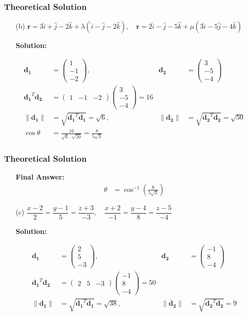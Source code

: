 \documentclass{beamer}
\theoremstyle{remark}
\newcommand{\myvec}[1]{\ensuremath{\begin{pmatrix}#1\end{pmatrix}}}
\let\vec\mathbf
\numberwithin{equation}{section}
\begin{document}
\begin{frame}
\frametitle{Theoretical Solution}
\begin{enumerate}
\item[(b)] 
$\vec{r} = 3\hat i + \hat j - 2\hat k + \lambda(\hat i - \hat j - 2\hat k), 
\quad 
\vec{r} = 2\hat i - \hat j - 5\hat k + \mu(3\hat i - 5\hat j - 4\hat k)$

\textbf{Solution:}  

\begin{align}
\vec{d_1} &= \myvec{1 \\ -1 \\ -2}, &
\vec{d_2} &= \myvec{3 \\ -5 \\ -4} \\[6pt]
\vec{d_1}^T \vec{d_2} &= \myvec{1 & -1 & -2}\myvec{3 \\ -5 \\ -4} = 16 \\[6pt]
\|\vec{d_1}\| &= \sqrt{\vec{d_1}^T \vec{d_1}} = \sqrt{6}, &
\|\vec{d_2}\| &= \sqrt{\vec{d_2}^T \vec{d_2}} = \sqrt{50} \\[6pt]
\cos\theta &= \frac{16}{\sqrt{6}\cdot \sqrt{50}} = \frac{8}{5\sqrt{3}}
\end{align}
\end{enumerate}
\end{frame}

\begin{frame}
\frametitle{Theoretical Solution}

\begin{enumerate}
\item[] 
\textbf{Final Answer:}  
\begin{align}
\theta &= \cos^{-1}\!\left(\tfrac{8}{5\sqrt{3}}\right)
\end{align}


\item[(c)] 
$\dfrac{x-2}{2} = \dfrac{y-1}{5} = \dfrac{z+3}{-3}, 
\quad 
\dfrac{x+2}{-1} = \dfrac{y-4}{8} = \dfrac{z-5}{-4}$

\textbf{Solution:}  

\begin{align}
\vec{d_1} &= \myvec{2 \\ 5 \\ -3}, &
\vec{d_2} &= \myvec{-1 \\ 8 \\ -4} \\[6pt]
\vec{d_1}^T \vec{d_2} &= \myvec{2 & 5 & -3}\myvec{-1 \\ 8 \\ -4} = 50 \\[6pt]
\|\vec{d_1}\| &= \sqrt{\vec{d_1}^T \vec{d_1}} = \sqrt{38}, &
\|\vec{d_2}\| &= \sqrt{\vec{d_2}^T \vec{d_2}} = 9
\end{align}
\end{enumerate}

\end{frame}
\end{document}
